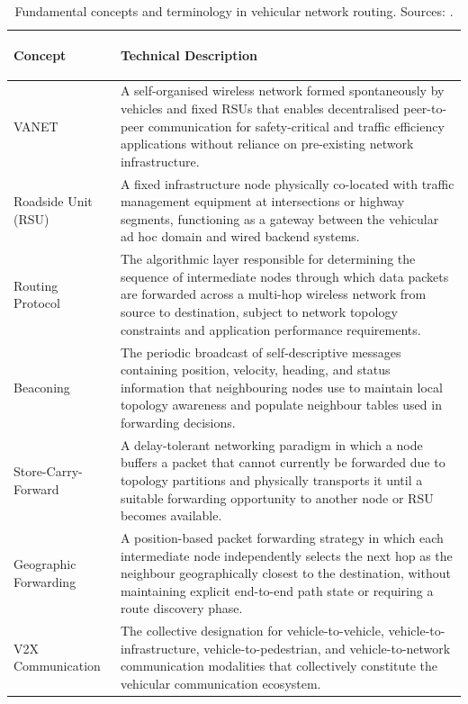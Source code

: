 \documentclass[12pt]{article}
\begin{document}
\begingroup
\renewcommand{\arraystretch}{1.5}
\noindent
\begin{table}[H]
	\centering
	\caption{Fundamental concepts and terminology in vehicular network routing.
	         Sources: \cite{boukerche2011routing,li2007routing,vegni2015survey,karagiannis2011vehicular}.}
	\label{tab:concepts}
	\begin{tabular}{|>{\bfseries\hyphenpenalty=10000\exhyphenpenalty=10000\raggedright\arraybackslash}p{}|>{\hyphenpenalty=10000\exhyphenpenalty=10000\raggedright\arraybackslash}p{}|}
		\hline
		\textbf{Concept} & \textbf{Technical Description} \\
		\hline
		VANET &
		  A self-organised wireless network formed spontaneously by vehicles and
		  fixed RSUs that enables decentralised peer-to-peer communication for
		  safety-critical and traffic efficiency applications without reliance on
		  pre-existing network infrastructure. \\[4pt]
		\hline
		Roadside Unit (RSU) &
		  A fixed infrastructure node physically co-located with traffic management
		  equipment at intersections or highway segments, functioning as a gateway
		  between the vehicular ad hoc domain and wired backend systems. \\[4pt]
		\hline
		Routing Protocol &
		  The algorithmic layer responsible for determining the sequence of
		  intermediate nodes through which data packets are forwarded across a
		  multi-hop wireless network from source to destination, subject to network
		  topology constraints and application performance requirements. \\[4pt]
		\hline
		Beaconing &
		  The periodic broadcast of self-descriptive messages containing position,
		  velocity, heading, and status information that neighbouring nodes use to
		  maintain local topology awareness and populate neighbour tables used in
		  forwarding decisions. \\[4pt]
		\hline
		Store-Carry-Forward &
		  A delay-tolerant networking paradigm in which a node buffers a packet
		  that cannot currently be forwarded due to topology partitions and
		  physically transports it until a suitable forwarding opportunity to
		  another node or RSU becomes available. \\[4pt]
		\hline
		Geographic Forwarding &
		  A position-based packet forwarding strategy in which each intermediate
		  node independently selects the next hop as the neighbour geographically
		  closest to the destination, without maintaining explicit end-to-end path
		  state or requiring a route discovery phase. \\[4pt]
		\hline
		V2X Communication &
		  The collective designation for vehicle-to-vehicle, vehicle-to-infrastructure,
		  vehicle-to-pedestrian, and vehicle-to-network communication modalities
		  that collectively constitute the vehicular communication ecosystem. \\[4pt]
		\hline
	\end{tabular}
\end{table}
\end{document}
